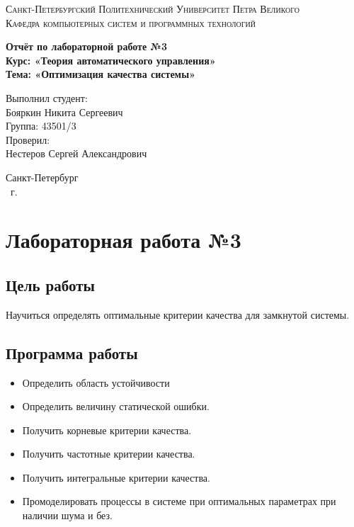 \documentclass[14pt,a4paper,report]{report}
\begin{document}
\def\contentsname{Содержание}

\begin{titlepage}
	\begin{center}
		\textsc{Санкт-Петербургский Политехнический 
			Университет Петра Великого\\[5mm]
			Кафедра компьютерных систем и программных технологий}
		
		\vfill
		
		\textbf{Отчёт по лабораторной работе №3\\[3mm]
			Курс: «Теория автоматического управления»\\[3mm]
			Тема: «Оптимизация качества системы»\\[35mm]
			}
	\end{center}
	
	\hfill
	\begin{minipage}{.5\textwidth}
		Выполнил студент:\\[2mm] 
		Бояркин Никита Сергеевич\\
		Группа: 43501/3\\[5mm]
		
		Проверил:\\[2mm] 
		Нестеров Сергей Александрович
	\end{minipage}
	\vfill
	\begin{center}
		Санкт-Петербург\\ \the\year\ г.
	\end{center}
\end{titlepage}

\tableofcontents
\clearpage

\chapter{Лабораторная работа №3}

\section{Цель работы}

Научиться определять оптимальные критерии качества для замкнутой системы.

\section{Программа работы}

\begin{itemize}
	\item Определить область устойчивости
	\item Определить величину статической ошибки.
	\item Получить корневые критерии качества.
	\item Получить частотные критерии качества.
	\item Получить интегральные критерии качества.
	\item Промоделировать процессы в системе при оптимальных параметрах при наличии шума и без.
\end{itemize}
\end{document}
